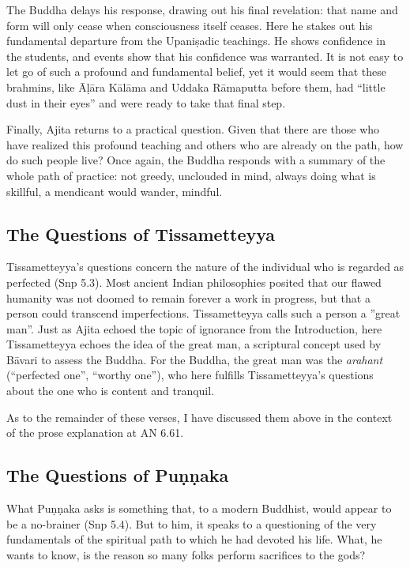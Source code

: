 \documentclass[12pt,openany]{book}%
\begin{document}
The Buddha delays his response, drawing out his final revelation: that name and form will only cease when consciousness itself ceases. Here he stakes out his fundamental departure from the \textsanskrit{Upaniṣadic} teachings. He shows confidence in the students, and events show that his confidence was warranted. It is not easy to let go of such a profound and fundamental belief, yet it would seem that these brahmins, like \textsanskrit{Āḷāra} \textsanskrit{Kālāma} and Uddaka \textsanskrit{Rāmaputta} before them, had “little dust in their eyes” and were ready to take that final step.

Finally, Ajita returns to a practical question. Given that there are those who have realized this profound teaching and others who are already on the path, how do such people live? Once again, the Buddha responds with a summary of the whole path of practice: not greedy, unclouded in mind, always doing what is skillful, a mendicant would wander, mindful.

\subsection*{The Questions of Tissametteyya}

Tissametteyya’s questions concern the nature of the individual who is regarded as perfected (Snp 5.3). Most ancient Indian philosophies posited that our flawed humanity was not doomed to remain forever a work in progress, but that a person could transcend imperfections. Tissametteyya calls such a person a ”great man”. Just as Ajita echoed the topic of ignorance from the Introduction, here Tissametteyya echoes the idea of the great man, a scriptural concept used by \textsanskrit{Bāvari} to assess the Buddha. For the Buddha, the great man was the \textit{arahant} (“perfected one”, “worthy one”), who here fulfills Tissametteyya’s questions about the one who is content and tranquil.

As to the remainder of these verses, I have discussed them above in the context of the prose explanation at AN 6.61.

\subsection*{The Questions of \textsanskrit{Puṇṇaka}}

What \textsanskrit{Puṇṇaka} asks is something that, to a modern Buddhist, would appear to be a no-brainer (Snp 5.4). But to him, it speaks to a questioning of the very fundamentals of the spiritual path to which he had devoted his life. What, he wants to know, is the reason so many folks perform sacrifices to the gods?
\end{document}
